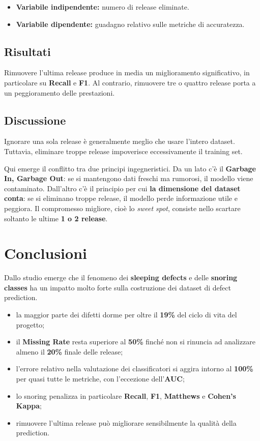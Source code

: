 \begin{itemize}
    \item \textbf{Variabile indipendente:} numero di release eliminate.
    \item \textbf{Variabile dipendente:} guadagno relativo sulle metriche di accuratezza.
\end{itemize}

\subsection{Risultati}

Rimuovere l'ultima release produce in media un miglioramento significativo, in particolare su \textbf{Recall} e \textbf{F1}. Al contrario, rimuovere tre o quattro release porta a un peggioramento delle prestazioni.

\subsection{Discussione}

Ignorare una sola release è generalmente meglio che usare l'intero dataset. Tuttavia, eliminare troppe release impoverisce eccessivamente il training set.

\begin{notaprof}
Qui emerge il conflitto tra due principi ingegneristici. Da un lato c'è il \textbf{Garbage In, Garbage Out}: se si mantengono dati freschi ma rumorosi, il modello viene contaminato. Dall'altro c'è il principio per cui \textbf{la dimensione del dataset conta}: se si eliminano troppe release, il modello perde informazione utile e peggiora. Il compromesso migliore, cioè lo \emph{sweet spot}, consiste nello scartare soltanto le ultime \textbf{1 o 2 release}.
\end{notaprof}

\section{Conclusioni}

Dallo studio emerge che il fenomeno dei \textbf{sleeping defects} e delle \textbf{snoring classes} ha un impatto molto forte sulla costruzione dei dataset di defect prediction.

\begin{itemize}
    \item la maggior parte dei difetti dorme per oltre il \textbf{19\%} del ciclo di vita del progetto;
    \item il \textbf{Missing Rate} resta superiore al \textbf{50\%} finché non si rinuncia ad analizzare almeno il \textbf{20\%} finale delle release;
    \item l'errore relativo nella valutazione dei classificatori si aggira intorno al \textbf{100\%} per quasi tutte le metriche, con l'eccezione dell'\textbf{AUC};
    \item lo snoring penalizza in particolare \textbf{Recall}, \textbf{F1}, \textbf{Matthews} e \textbf{Cohen's Kappa};
    \item rimuovere l'ultima release può migliorare sensibilmente la qualità della prediction.
\end{itemize}

